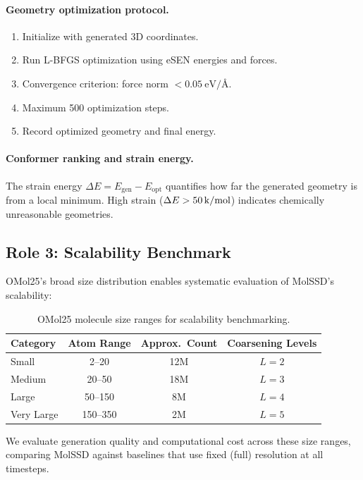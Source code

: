 \documentclass[12pt,a4paper]{article}
\begin{document}
\paragraph{Geometry optimization protocol.}
\begin{enumerate}
    \item Initialize with generated 3D coordinates.
    \item Run L-BFGS optimization using eSEN energies and forces.
    \item Convergence criterion: force norm $< \SI{0.05}{\electronvolt\per\angstrom}$.
    \item Maximum 500 optimization steps.
    \item Record optimized geometry and final energy.
\end{enumerate}

\paragraph{Conformer ranking and strain energy.} The strain energy $\Delta E = E_{\text{gen}} - E_{\text{opt}}$ quantifies how far the generated geometry is from a local minimum. High strain ($\Delta E > \SI{50}{\kilo\cal\per\mol}$) indicates chemically unreasonable geometries.

\subsection{Role 3: Scalability Benchmark}\label{sec:scalability}

OMol25's broad size distribution enables systematic evaluation of MolSSD's scalability:

\begin{table}[H]
\centering
\caption{OMol25 molecule size ranges for scalability benchmarking.}
\label{tab:size_ranges}
\begin{tabular}{lccc}
\toprule
\textbf{Category} & \textbf{Atom Range} & \textbf{Approx.\ Count} & \textbf{Coarsening Levels} \\
\midrule
Small & 2--20 & 12M & $L = 2$ \\
Medium & 20--50 & 18M & $L = 3$ \\
Large & 50--150 & 8M & $L = 4$ \\
Very Large & 150--350 & 2M & $L = 5$ \\
\bottomrule
\end{tabular}
\end{table}

We evaluate generation quality and computational cost across these size ranges, comparing MolSSD against baselines that use fixed (full) resolution at all timesteps.
\end{document}
